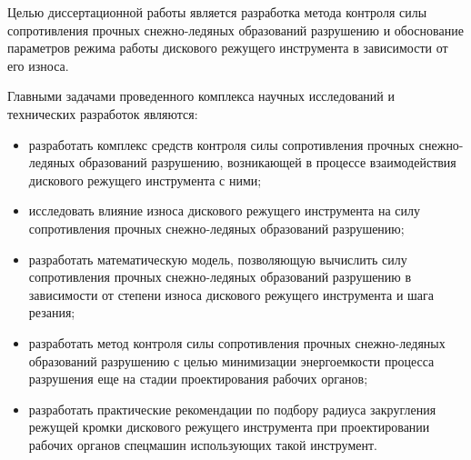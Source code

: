 Целью диссертационной работы является разработка метода контроля силы сопротивления прочных снежно-ледяных образований разрушению и обоснование параметров режима работы дискового режущего инструмента в зависимости от его износа.

Главными задачами проведенного комплекса научных исследований и технических разработок являются:
\begin{itemize}
	\item разработать комплекс средств контроля силы сопротивления прочных снежно-ледяных образований разрушению, возникающей в процессе взаимодействия дискового режущего инструмента с ними;
	\item исследовать влияние износа дискового режущего инструмента на силу сопротивления прочных снежно-ледяных образований разрушению;
	\item разработать математическую модель, позволяющую вычислить силу сопротивления прочных снежно-ледяных образований разрушению в зависимости от степени износа дискового режущего инструмента и шага резания;
	\item разработать метод контроля силы сопротивления прочных снежно-ледяных образований разрушению с целью минимизации энергоемкости процесса разрушения еще на стадии проектирования рабочих органов;
	\item разработать практические рекомендации по подбору радиуса закругления режущей кромки дискового режущего инструмента при проектировании рабочих органов спецмашин использующих такой инструмент.
\end{itemize}